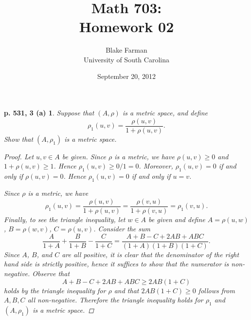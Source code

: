 \documentclass[10pt]{amsart}
\author{Blake Farman\\University of South Carolina}
\title{Math 703:\\Homework 02}
\date{September 20, 2012}
\begin{document}
\maketitle

\providecommand{\norm}[1]{\lVert#1\rVert}
\renewcommand{\qedsymbol}{\ensuremath{\blacksquare}}
\newcommand{\abs}[1]{\left| #1 \right|}

\newtheorem*{ex3a}{p. 531, 3 (a)}
\newtheorem*{ex4}{p. 531, 4}
\newtheorem*{ex13}{p. 532, 13}
\newtheorem*{ex25}{p. 535, 25}

\begin{ex3a}
  Suppose that $(A,\rho)$ is a metric space, and define 
  $$\rho_1(u,v) = \frac{\rho(u,v)}{1 + \rho(u,v)}.$$
  Show that $(A, \rho_1)$ is a metric space.
  
  \begin{proof}
    Let $u,v \in A$ be given.
    Since $\rho$ is a metric, we have $\rho(u,v) \geq 0$ and $1 + \rho(u,v) \geq 1$.
    Hence $\rho_1(u,v) \geq 0 / 1 = 0$.
    Moreover, $\rho_1(u,v) = 0$ if and only if $\rho(u,v) = 0$.  
    Hence $\rho_1(u,v) = 0$ if and only if $u = v$.
    
    Since $\rho$ is a metric, we have
    $$\rho_1(u,v) = \frac{\rho(u,v)}{1 + \rho(u,v)} = \frac{\rho(v,u)}{1 + \rho(v,u)} = \rho_1(v,u).$$
    Finally, to see the triangle inequality, let $w \in A$ be given and define $A = \rho(u,w)$, $B = \rho(w,v)$, $C = \rho(u,v)$.
    Consider the sum
    $$ \frac{A}{1+A} + \frac{B}{1 + B} - \frac{C}{1+C} = \frac{A + B - C + 2AB + ABC}{(1+A)(1+B)(1+C)}.$$
    Since $A$, $B$, and $C$ are all positive, it is clear that the denominator of the right hand side is strictly positive, hence it suffices to show that the numerator is non-negative.
    Observe that $$A + B - C + 2AB + ABC \geq 2AB(1 + C)$$ holds by the triangle inequality for $\rho$ and that $2AB(1+C) \geq 0$ follows from $A,B,C$ all non-negative.
    Therefore the triangle inequality holds for $\rho_1$ and $(A,\rho_1)$ is a metric space.
  \end{proof}
\end{ex3a}
\end{document}
